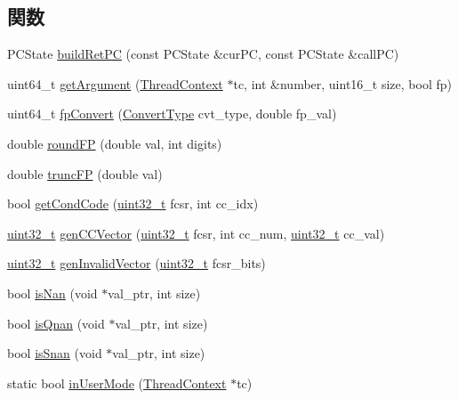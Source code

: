 \subsection*{関数}
\begin{DoxyCompactItemize}
\item 
PCState \hyperlink{namespaceMipsISA_a2f28a29005a886eacf4d9d5c44ca111e}{buildRetPC} (const PCState \&curPC, const PCState \&callPC)
\item 
uint64\_\-t \hyperlink{namespaceMipsISA_a3f9560369e934be05b1dd8f23fbd6104}{getArgument} (\hyperlink{classThreadContext}{ThreadContext} $\ast$tc, int \&number, uint16\_\-t size, bool fp)
\item 
uint64\_\-t \hyperlink{namespaceMipsISA_aef24bb5b95ababfcc53737354f899410}{fpConvert} (\hyperlink{namespaceMipsISA_a3eb2ef7126c12e67d97d307c7aaa381d}{ConvertType} cvt\_\-type, double fp\_\-val)
\item 
double \hyperlink{namespaceMipsISA_a4205d010266118ca5ba2e7f99f6161f8}{roundFP} (double val, int digits)
\item 
double \hyperlink{namespaceMipsISA_a757a04b4d813824b1f006a8223f37966}{truncFP} (double val)
\item 
bool \hyperlink{namespaceMipsISA_a03ccbfe054e56369bcfef50d0e9e9284}{getCondCode} (\hyperlink{Type_8hh_a435d1572bf3f880d55459d9805097f62}{uint32\_\-t} fcsr, int cc\_\-idx)
\item 
\hyperlink{Type_8hh_a435d1572bf3f880d55459d9805097f62}{uint32\_\-t} \hyperlink{namespaceMipsISA_ab28e8a16ffbefccfa65df228a13bbfe2}{genCCVector} (\hyperlink{Type_8hh_a435d1572bf3f880d55459d9805097f62}{uint32\_\-t} fcsr, int cc\_\-num, \hyperlink{Type_8hh_a435d1572bf3f880d55459d9805097f62}{uint32\_\-t} cc\_\-val)
\item 
\hyperlink{Type_8hh_a435d1572bf3f880d55459d9805097f62}{uint32\_\-t} \hyperlink{namespaceMipsISA_ac248600d7063a3175e01d23e0341ed2f}{genInvalidVector} (\hyperlink{Type_8hh_a435d1572bf3f880d55459d9805097f62}{uint32\_\-t} fcsr\_\-bits)
\item 
bool \hyperlink{namespaceMipsISA_acd4560888a946cc49bfa4e4714576355}{isNan} (void $\ast$val\_\-ptr, int size)
\item 
bool \hyperlink{namespaceMipsISA_ac73ebd248ede21383ddd8a84978d5dbd}{isQnan} (void $\ast$val\_\-ptr, int size)
\item 
bool \hyperlink{namespaceMipsISA_a688fdecf4f2d2faf933cb4085c72c003}{isSnan} (void $\ast$val\_\-ptr, int size)
\item 
static bool \hyperlink{namespaceMipsISA_a1afb0b4065513135cf7543096d80cfc4}{inUserMode} (\hyperlink{classThreadContext}{ThreadContext} $\ast$tc)

\end{DoxyCompactItemize}
